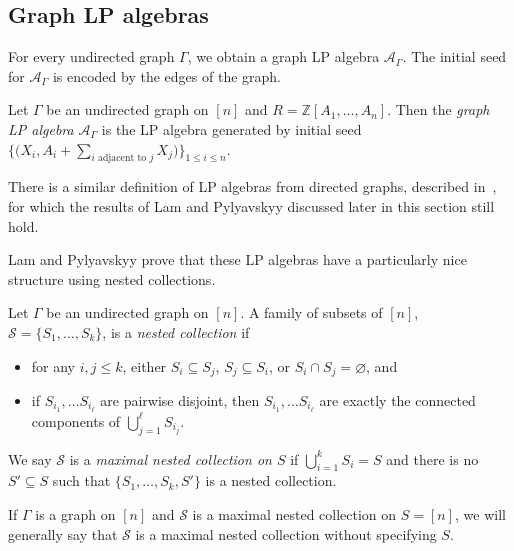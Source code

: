 \documentclass[pdftex]{sigma}
\numberwithin{equation}{section}
\newcommand{\calS}{\mathcal{S}}
\newcommand{\Z}{\mathbb{Z}}
\begin{document}
\subsection{Graph LP algebras}\label{sec:graph-LP}
For every undirected graph $\Gamma$, we obtain a graph LP algebra $\mathcal{A}_\Gamma$. The initial seed for $\mathcal{A}_\Gamma$ is encoded by the edges of the graph.
\begin{Definition}\label{defn:graph-LP}
Let $\Gamma$ be an undirected graph on $[n]$ and $R=\Z[A_1,\dots,A_n]$. Then the \emph{graph LP algebra} $\mathcal{A}_\Gamma$ is the LP algebra generated by initial seed $ \big\{\big(X_i,A_i+\sum_{i\text{ adjacent to }j}X_j\big)\big\}_{1\leq i\leq n}$.
\end{Definition}
\begin{Remark}There is a similar definition of LP algebras from directed graphs, described in~\cite{LP-16}, for which the results of Lam and Pylyavskyy discussed later in this section still hold.
\end{Remark}
Lam and Pylyavskyy prove that these LP algebras have a particularly nice structure using nested collections.
\begin{Definition}\label{defn:nested-coll}
Let $\Gamma$ be an undirected graph on $[n]$. A family of subsets of $[n]$, $\calS=\{S_1,\dots,S_k\}$, is a \emph{nested collection} if
\begin{itemize}\itemsep=0pt
 \item for any $i,j\leq k$, either $S_i\subseteq S_j$, $S_j\subseteq S_i$, or $S_i\cap S_j=\varnothing$, and
 \item if $S_{i_1},\dots S_{i_\ell}$ are pairwise disjoint, then $S_{i_1},\dots S_{i_\ell}$ are exactly the connected components of $\bigcup_{j=1}^\ell S_{i_j}$.
\end{itemize}
We say $\calS$ is a \emph{maximal nested collection on $S$} if $\bigcup_{i=1}^k S_i=S$ and there is no $S'\subseteq S$ such that $\{S_1,\dots,S_k,S'\}$ is a nested collection.
\end{Definition}
If $\Gamma$ is a graph on $[n]$ and $\calS$ is a maximal nested collection on $S=[n]$, we will generally say that $\calS$ is a maximal nested collection without specifying $S$.
\end{document}
